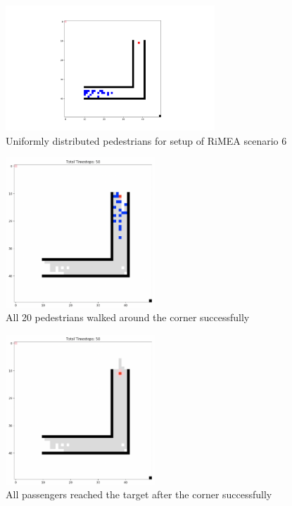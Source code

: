 \documentclass[10pt,a4paper]{article}
\begin{document}
\begin{figure}
    \centering
    \includegraphics[width=0.7\textwidth]{pictures/Test5.png}
    \caption{Uniformly distributed pedestrians for setup of RiMEA scenario 6}
    \label{fig:test5_1}
\end{figure}
\begin{figure}
    \centering
    \includegraphics[width=0.5\textwidth]{pictures/Test5_meanwhile.png}
    \caption{All 20 pedestrians walked around the corner successfully}
    \label{fig:Test5_2}
\end{figure}
\begin{figure}
    \centering
    \includegraphics[width=0.5\textwidth]{pictures/Test5_End.png}
    \caption{All passengers reached the target after the corner successfully}
    \label{fig:Test5_End}
\end{figure}


\end{document}
